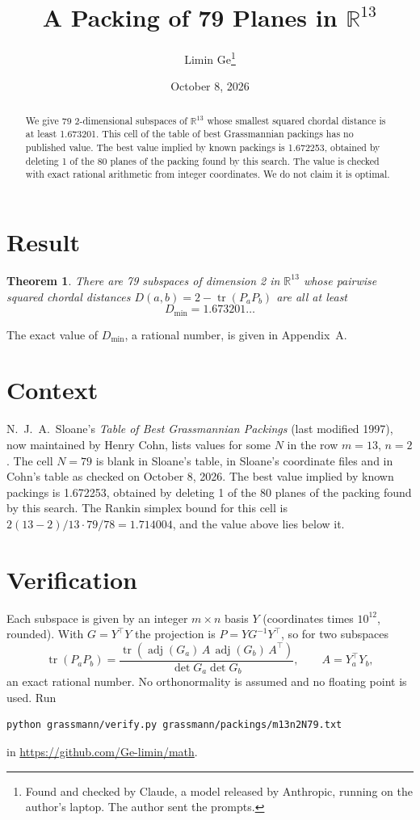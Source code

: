 \documentclass[11pt,a4paper]{article}
\title{A Packing of 79 Planes in $\mathbb{R}^{13}$}
\author{Limin Ge\thanks{Found and checked by Claude, a model released by Anthropic, running on the author's laptop. The author sent the prompts.}}
\date{October 8, 2026}
\newtheorem*{theorem}{Theorem}
\begin{document}
\maketitle
\begin{abstract}
We give 79 2-dimensional subspaces of $\mathbb{R}^{13}$ whose smallest squared chordal distance is at least 1.673201. This cell of the table of best Grassmannian packings has no published value. The best value implied by known packings is 1.672253, obtained by deleting 1 of the 80 planes of the packing found by this search. The value is checked with exact rational arithmetic from integer coordinates. We do not claim it is optimal.
\end{abstract}

\section{Result}
\begin{theorem}
There are 79 subspaces of dimension 2 in $\mathbb{R}^{13}$ whose pairwise squared chordal distances $D(a,b) = 2 - \operatorname{tr}(P_aP_b)$ are all at least
\[ D_{\min} = 1.673201\ldots \]
\end{theorem}
The exact value of $D_{\min}$, a rational number, is given in Appendix~A.


\section{Context}
N.~J.~A.~Sloane's \emph{Table of Best Grassmannian Packings} (last modified 1997), now maintained by Henry Cohn, lists values for some $N$ in the row $m=13$, $n=2$. The cell $N=79$ is blank in Sloane's table, in Sloane's coordinate files and in Cohn's table as checked on October 8, 2026. The best value implied by known packings is 1.672253, obtained by deleting 1 of the 80 planes of the packing found by this search. The Rankin simplex bound for this cell is $2(13-2)/13\cdot 79/78 = 1.714004$, and the value above lies below it.


\section{Verification}
Each subspace is given by an integer $m\times n$ basis $Y$ (coordinates times $10^{12}$, rounded). With $G=Y^\top Y$ the projection is $P=YG^{-1}Y^\top$, so for two subspaces
\[ \operatorname{tr}(P_aP_b)=\frac{\operatorname{tr}(\operatorname{adj}(G_a)\,A\,\operatorname{adj}(G_b)\,A^\top)}{\det G_a\det G_b},\qquad A=Y_a^\top Y_b, \]
an exact rational number. No orthonormality is assumed and no floating point is used. Run
\begin{verbatim}
python grassmann/verify.py grassmann/packings/m13n2N79.txt
\end{verbatim}
in \url{https://github.com/Ge-limin/math}.
\end{document}
